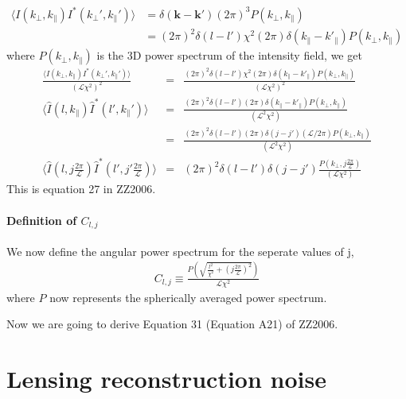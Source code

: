 \documentclass[12pt]{article}
\newcommand{\beq}{\begin{equation}}
\newcommand{\eeq}{\end{equation}}
\newcommand{\beqa}{\begin{eqnarray}}
\newcommand{\eeqa}{\end{eqnarray}}
\newcommand{\beqal}{\begin{aligned}}
\newcommand{\eeqal}{\end{aligned}}
\def\lbox{\mathcal{L}}
\numberwithin{equation}{section}
\begin{document}
\beq
\beqal
\langle I(k_\perp, k_\parallel) I^*(k_\perp', k_\parallel')   \rangle &= \delta(\textbf{k} - \textbf{k}') (2\pi)^3 P(k_\perp, k_\parallel)
\\
&= (2\pi)^2 \delta(l - l') \chi^2 (2\pi) \delta(k_\parallel - k'_\parallel) P(k_\perp, k_\parallel) \label{eq:3dcorr}
\eeqal
\eeq
where  $ P(k_\perp, k_\parallel) $ is the 3D power spectrum of the intensity field, we get
\beqa
\frac{\langle I(k_\perp, k_\parallel) I^*(k_\perp', k_\parallel')   \rangle}{(\mathcal{L} \chi^2)^2} &=& \frac{(2\pi)^2 \delta(l - l') \chi^2 (2\pi) \delta(k_\parallel - k'_\parallel) P(k_\perp, k_\parallel) }{(\mathcal{L} \chi^2)^2}
\\
\langle \hat{I}(l, k_\parallel) \hat{I}^*(l', k_\parallel')   \rangle &=& \frac{(2\pi)^2 \delta(l - l')  (2\pi) \delta(k_\parallel - k'_\parallel) P(k_\perp, k_\parallel) }{(\mathcal{L}^2 \chi^2)}
\\
&=& \frac{(2\pi)^2 \delta(l - l')  (2\pi) \delta(j - j') (\mathcal{L}/2\pi) P(k_\perp, k_\parallel) }{(\mathcal{L}^2 \chi^2)}
\\
\langle \hat{I}(l, j \frac{2\pi}{\mathcal{L}}) \hat{I}^*(l', j'\frac{2\pi}{\mathcal{L}})   \rangle  &=& (2\pi)^2 \delta(l - l') \delta(j - j')  \frac{P(k_\perp, j\frac{2\pi}{\mathcal{L}}) }{(\mathcal{L} \chi^2)}
\eeqa
This is equation 27 in ZZ2006.

\paragraph{Definition of $ C_{l,j} $}
We now define the angular power spectrum for the seperate values of j, 
\beqa
C_{l,j} \equiv \frac{P \left( \sqrt{\frac{l^2}{\chi^2} + (j\frac{2\pi}{\mathcal{L}})^2} \right)}{\lbox \chi^2}
\eeqa
where $ P $ now represents the spherically averaged power spectrum.


Now we are going to derive Equation 31 (Equation A21) of ZZ2006.

\section{Lensing reconstruction noise}
\end{document}
